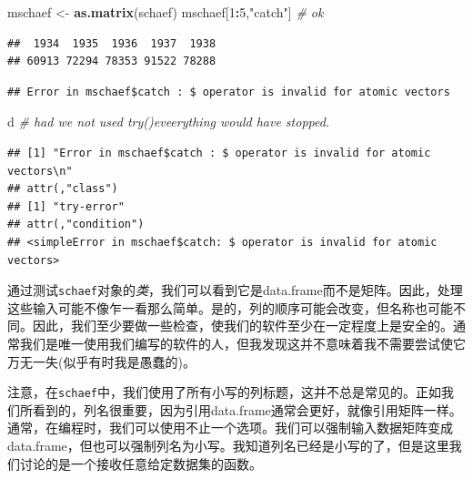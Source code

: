 \documentclass[
  lang=cn,
  11pt,
  scheme=chinese,
  chinesefont=nofont,
  citestyle=gb7714-2015,
  bibstyle=gb7714-2015]{elegantbook}
\newenvironment{Shaded}{\begin{snugshade}}{\end{snugshade}}
\newcommand{\CommentTok}[1]{\textcolor[rgb]{0.56,0.35,0.01}{\textit{#1}}}
\newcommand{\DecValTok}[1]{\textcolor[rgb]{0.00,0.00,0.81}{#1}}
\newcommand{\FunctionTok}[1]{\textcolor[rgb]{0.13,0.29,0.53}{\textbf{#1}}}
\newcommand{\NormalTok}[1]{#1}
\newcommand{\OtherTok}[1]{\textcolor[rgb]{0.56,0.35,0.01}{#1}}
\newcommand{\SpecialCharTok}[1]{\textcolor[rgb]{0.81,0.36,0.00}{\textbf{#1}}}
\newcommand{\StringTok}[1]{\textcolor[rgb]{0.31,0.60,0.02}{#1}}
\begin{document}
\begin{Shaded}
\begin{Highlighting}[]
\NormalTok{mschaef }\OtherTok{\textless{}{-}} \FunctionTok{as.matrix}\NormalTok{(schaef)  }
\NormalTok{mschaef[}\DecValTok{1}\SpecialCharTok{:}\DecValTok{5}\NormalTok{,}\StringTok{"catch"}\NormalTok{]  }\CommentTok{\# ok  }
\end{Highlighting}
\end{Shaded}

\begin{verbatim}
##  1934  1935  1936  1937  1938 
## 60913 72294 78353 91522 78288
\end{verbatim}

\begin{Shaded}
\end{Shaded}

\begin{verbatim}
## Error in mschaef$catch : $ operator is invalid for atomic vectors
\end{verbatim}

\begin{Shaded}
\begin{Highlighting}[]
\NormalTok{d  }\CommentTok{\# had we not used try()eveerything would have stopped.  }
\end{Highlighting}
\end{Shaded}

\begin{verbatim}
## [1] "Error in mschaef$catch : $ operator is invalid for atomic vectors\n"
## attr(,"class")
## [1] "try-error"
## attr(,"condition")
## <simpleError in mschaef$catch: $ operator is invalid for atomic vectors>
\end{verbatim}

通过测试\texttt{schaef}对象的\emph{类}，我们可以看到它是data.frame而不是矩阵。因此，处理这些输入可能不像乍一看那么简单。是的，列的顺序可能会改变，但名称也可能不同。因此，我们至少要做一些检查，使我们的软件至少在一定程度上是安全的。通常我们是唯一使用我们编写的软件的人，但我发现这并不意味着我不需要尝试使它万无一失(似乎有时我是愚蠢的)。

注意，在\texttt{schaef}中，我们使用了所有小写的列标题，这并不总是常见的。正如我们所看到的，列名很重要，因为引用data.frame通常会更好，就像引用矩阵一样。通常，在编程时，我们可以使用不止一个选项。我们可以强制输入数据矩阵变成data.frame，但也可以强制列名为小写。我知道列名已经是小写的了，但是这里我们讨论的是一个接收任意给定数据集的函数。
\end{document}
